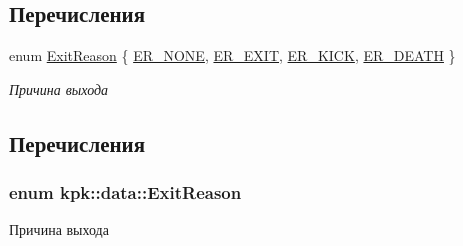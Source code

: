 \subsection*{Перечисления}
\begin{DoxyCompactItemize}
\item 
enum \hyperlink{namespacekpk_1_1data_a16790bc647a6788cab282e185ee28998}{Exit\+Reason} \{ \hyperlink{namespacekpk_1_1data_a16790bc647a6788cab282e185ee28998aa134c23d38704d99db23ef993830c24a}{E\+R\+\_\+\+N\+O\+NE}, 
\hyperlink{namespacekpk_1_1data_a16790bc647a6788cab282e185ee28998a72cce9ef1a1a013bca99ece41bc13431}{E\+R\+\_\+\+E\+X\+IT}, 
\hyperlink{namespacekpk_1_1data_a16790bc647a6788cab282e185ee28998a8cfb19daa38668796673a2ce7ce15f24}{E\+R\+\_\+\+K\+I\+CK}, 
\hyperlink{namespacekpk_1_1data_a16790bc647a6788cab282e185ee28998a2063b2e237a0013b06ed6eedc4b8bc48}{E\+R\+\_\+\+D\+E\+A\+TH}
 \}\begin{DoxyCompactList}\small\item\em Причина выхода \end{DoxyCompactList}
\end{DoxyCompactItemize}


\subsection{Перечисления}
\subsubsection[{\texorpdfstring{Exit\+Reason}{ExitReason}}]{\setlength{\rightskip}{0pt plus 5cm}enum {\bf kpk\+::data\+::\+Exit\+Reason}}\hypertarget{namespacekpk_1_1data_a16790bc647a6788cab282e185ee28998}{}\label{namespacekpk_1_1data_a16790bc647a6788cab282e185ee28998}


Причина выхода 

